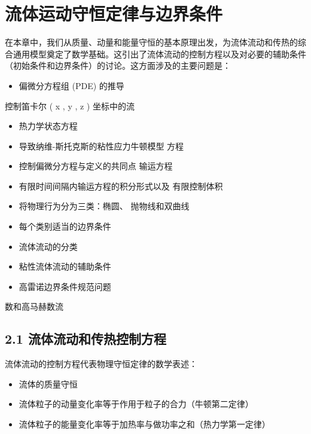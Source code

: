 \documentclass[11pt,a4paper,openany,fontset=none]{ctexbook}
\begin{document}
\chapter{流体运动守恒定律与边界条件}

在本章中，我们从质量、动量和能量守恒的基本原理出发，为流体流动和传热的综合通用模型奠定了数学基础。这引出了流体流动的控制方程以及对必要的辅助条件（初始条件和边界条件）的讨论。这方面涉及的主要问题是：

\begin{itemize}

\item 偏微分方程组 (PDE) 的推导

\end{itemize}

控制笛卡尔 ( x , y , z ) 坐标中的流

\begin{itemize}

\item 热力学状态方程

\item 导致纳维-斯托克斯的粘性应力牛顿模型 方程

\item 控制偏微分方程与定义的共同点 输运方程

\item 有限时间间隔内输运方程的积分形式以及 有限控制体积

\item 将物理行为分为三类：椭圆、 抛物线和双曲线

\item 每个类别适当的边界条件

\item 流体流动的分类

\item 粘性流体流动的辅助条件

\item 高雷诺边界条件规范问题

\end{itemize}

数和高马赫数流

\section*{2.1 流体流动和传热控制方程}

流体流动的控制方程代表物理守恒定律的数学表述：

\begin{itemize}

\item 流体的质量守恒

\item 流体粒子的动量变化率等于作用于粒子的合力（牛顿第二定律）

\item 流体粒子的能量变化率等于加热率与做功率之和（热力学第一定律）

\end{itemize}
\end{document}
